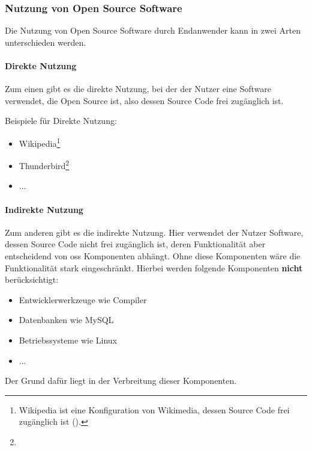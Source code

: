 \documentclass[a4paper]{article}
\begin{document}
            \subsubsection{Nutzung von Open Source Software}\label{section:indirekte_nutzung}
                Die Nutzung von Open Source Software durch Endanwender kann in zwei Arten unterschieden werden.
                
                \paragraph{Direkte Nutzung}
                    Zum einen gibt es die direkte Nutzung, bei der der Nutzer eine Software verwendet, die Open Source ist, also dessen Source Code frei zugänglich ist.
                    
                    Beispiele für Direkte Nutzung:
                    \begin{itemize}
                        \item Wikipedia\footnote{Wikipedia ist eine Konfiguration von Wikimedia, dessen Source Code frei zugänglich ist ().}
                        \item Thunderbird\footnote{}
                        \item ... %
                    \end{itemize}
                    
                \paragraph{Indirekte Nutzung}
                    Zum anderen gibt es die indirekte Nutzung. Hier verwendet der Nutzer Software, dessen Source Code nicht frei zugänglich ist, deren Funktionalität aber entscheidend von \gls{oss} Komponenten abhängt. Ohne diese Komponenten wäre die Funktionalität stark eingeschränkt. Hierbei werden folgende Komponenten \textbf{nicht} berücksichtigt:
                    
                    \begin{itemize}
                        \item Entwicklerwerkzeuge wie Compiler
                        \item Datenbanken wie MySQL
                        \item Betriebssysteme wie Linux 
                        \item ... %
                    \end{itemize}
                    Der Grund dafür liegt in der Verbreitung dieser Komponenten. %
                    
\end{document}
